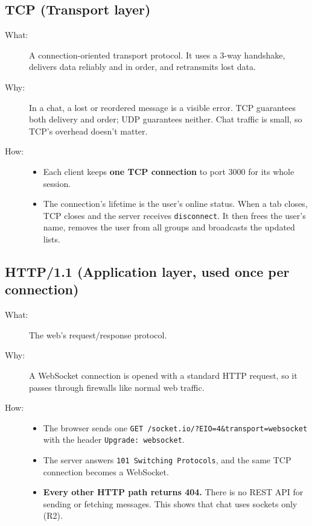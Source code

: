 \documentclass[11pt,a4paper]{article}
\newcommand{\code}[1]{\texttt{#1}}
\begin{document}
\subsection{TCP (Transport layer)}
\begin{description}
  \item[What:] A connection-oriented transport protocol. It uses a 3-way
    handshake, delivers data reliably and in order, and retransmits lost data.
  \item[Why:] In a chat, a lost or reordered message is a visible error. TCP
    guarantees both delivery and order; UDP guarantees neither. Chat traffic is
    small, so TCP's overhead doesn't matter.
  \item[How:]
    \begin{itemize}
      \item Each client keeps \textbf{one TCP connection} to port 3000 for its whole session.
      \item The connection's lifetime is the user's online status. When a tab
        closes, TCP closes and the server receives \code{disconnect}. It then
        frees the user's name, removes the user from all groups and broadcasts
        the updated lists.
    \end{itemize}
\end{description}

\subsection{HTTP/1.1 (Application layer, used once per connection)}
\begin{description}
  \item[What:] The web's request/response protocol.
  \item[Why:] A WebSocket connection is opened with a standard HTTP request, so
    it passes through firewalls like normal web traffic.
  \item[How:]
    \begin{itemize}
      \item The browser sends one \code{GET /socket.io/?EIO=4\&transport=websocket}
        with the header \code{Upgrade: websocket}.
      \item The server answers \code{101 Switching Protocols}, and the same TCP
        connection becomes a WebSocket.
      \item \textbf{Every other HTTP path returns 404.} There is no REST API for
        sending or fetching messages. This shows that chat uses sockets only (R2).
    \end{itemize}
\end{description}
\end{document}
